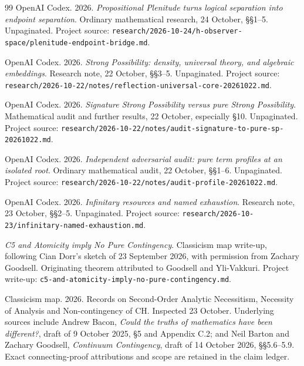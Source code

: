 \documentclass[12pt,letterpaper]{article}
\begin{document}
\begin{thebibliography}{99}
OpenAI Codex. 2026. \emph{Propositional Plenitude turns logical separation into endpoint separation}. Ordinary mathematical research, 24 October, \S\S1--5. Unpaginated. Project source: \nolinkurl{research/2026-10-24/h-observer-space/plenitude-endpoint-bridge.md}.

OpenAI Codex. 2026. \emph{Strong Possibility: density, universal theory, and algebraic embeddings}. Research note, 22 October, \S\S3--5. Unpaginated. Project source: \nolinkurl{research/2026-10-22/notes/reflection-universal-core-20261022.md}.

OpenAI Codex. 2026. \emph{Signature Strong Possibility versus pure Strong Possibility}. Mathematical audit and further results, 22 October, especially \S10. Unpaginated. Project source: \nolinkurl{research/2026-10-22/notes/audit-signature-to-pure-sp-20261022.md}.

OpenAI Codex. 2026. \emph{Independent adversarial audit: pure term profiles at an isolated root}. Ordinary mathematical audit, 22 October, \S\S1--6. Unpaginated. Project source: \nolinkurl{research/2026-10-22/notes/audit-profile-20261022.md}.

OpenAI Codex. 2026. \emph{Infinitary resources and named exhaustion}. Research note, 23 October, \S\S2--5. Unpaginated. Project source: \nolinkurl{research/2026-10-23/infinitary-named-exhaustion.md}.

\emph{C5 and Atomicity imply No Pure Contingency}. Classicism map write-up, following Cian Dorr's sketch of 23 September 2026, with permission from Zachary Goodsell. Originating theorem attributed to Goodsell and Yli-Vakkuri. Project write-up: \nolinkurl{c5-and-atomicity-imply-no-pure-contingency.md}.

Classicism map. 2026. Records on Second-Order Analytic Necessitism, Necessity of Analysis and Non-contingency of CH. Inspected 23 October. Underlying sources include Andrew Bacon, \emph{Could the truths of mathematics have been different?}, draft of 9 October 2025, \S5 and Appendix C.2; and Neil Barton and Zachary Goodsell, \emph{Continuum Contingency}, draft of 14 October 2026, \S\S5.6--5.9. Exact connecting-proof attributions and scope are retained in the claim ledger.


\end{thebibliography}
\end{document}
